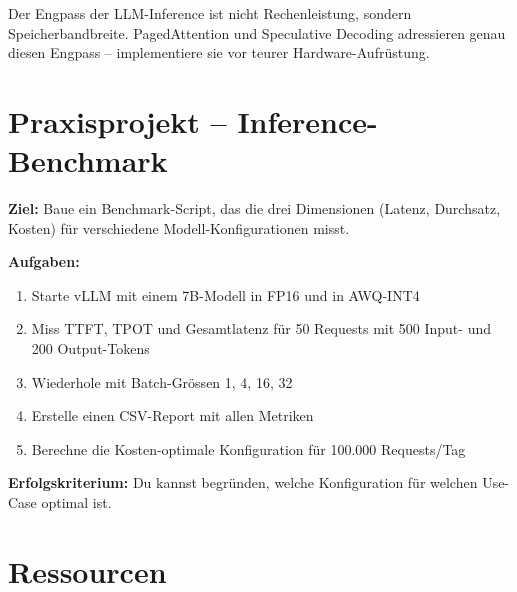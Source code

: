 \par\mbox{}\par
\begin{merkeEnv}
Der Engpass der LLM-Inference ist nicht Rechenleistung, sondern Speicherbandbreite. PagedAttention und Speculative Decoding adressieren genau diesen Engpass -- implementiere sie vor teurer Hardware-Aufrüstung.
\end{merkeEnv}

\section{Praxisprojekt -- Inference-Benchmark}

\textbf{Ziel:} Baue ein Benchmark-Script, das die drei Dimensionen (Latenz, Durchsatz, Kosten) für verschiedene Modell-Konfigurationen misst.

\textbf{Aufgaben:}
\begin{enumerate}[leftmargin=*]
    \item Starte vLLM mit einem 7B-Modell in FP16 und in AWQ-INT4
    \item Miss TTFT, TPOT und Gesamtlatenz für 50 Requests mit 500 Input- und 200 Output-Tokens
    \item Wiederhole mit Batch-Grössen 1, 4, 16, 32
    \item Erstelle einen CSV-Report mit allen Metriken
    \item Berechne die Kosten-optimale Konfiguration für 100.000 Requests/Tag
\end{enumerate}

\textbf{Erfolgskriterium:} Du kannst begründen, welche Konfiguration für welchen Use-Case optimal ist.

\section{Ressourcen}

